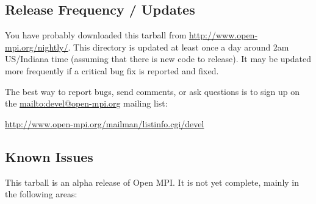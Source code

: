 
\subsection{Release Frequency / Updates}

You have probably downloaded this tarball from
\url{http://www.open-mpi.org/nightly/}.  This directory is updated at
least once a day around 2am US/Indiana time (assuming that there is
new code to release).  It may be updated more frequently if a critical
bug fix is reported and fixed.

The best way to report bugs, send comments, or ask questions is to
sign up on the \url{mailto:devel@open-mpi.org} mailing list:

\centerline{\url{http://www.open-mpi.org/mailman/listinfo.cgi/devel}}


\subsection{Known Issues}

This tarball is an alpha release of Open MPI.  It is not yet complete,
mainly in the following areas:

